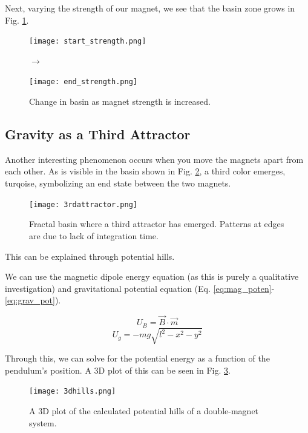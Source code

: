 \documentclass[prl,twocolumn,amsmath,amssymb,superscriptaddress]{revtex4-2}
\begin{document}
Next, varying the strength of our magnet, we see that the basin zone grows in Fig. \ref{fig:strength_interaction}.
\begin{figure}[htb]
    \begin{minipage}{0.45\linewidth}
        \texttt{[image: start\_strength.png]}
    \end{minipage}%
    \hspace{5pt}
    $\rightarrow$
    \begin{minipage}{0.45\linewidth}
        \texttt{[image: end\_strength.png]}
    \end{minipage}
    \caption{Change in basin as magnet strength is increased.}
    \label{fig:strength_interaction}
\end{figure}
\newpage
\subsection{Gravity as a Third Attractor}

Another interesting phenomenon occurs when you move the magnets apart from each other. As is visible in the basin shown in Fig. \ref{fig:3rd_attractor}, a third color emerges, turqoise, symbolizing an end state between the two magnets.

\begin{figure}[htb]
    \centering
    \vspace{-10pt}
    \texttt{[image: 3rdattractor.png]}
    \caption{Fractal basin where a third attractor has emerged. Patterns at edges are due to lack of integration time.}
    \label{fig:3rd_attractor}
\end{figure}

This can be explained through potential hills.

We can use the magnetic dipole energy equation (as this is purely a qualitative investigation) and gravitational potential equation (Eq. \ref{eq:mag_poten}-\ref{eq:grav_pot}).

\begin{equation}
    U_B = \vec{B} \cdot \vec{m}
    \label{eq:mag_poten}
\end{equation}
\begin{equation}
    U_g = -mg \sqrt{l^2-x^2-y^2}
    \label{eq:grav_pot}
\end{equation}

Through this, we can solve for the potential energy as a function of the pendulum's position. A 3D plot of this can be seen in Fig. \ref{fig:3dhills}.
\vspace{-10pt}
\begin{figure}[htb]
    \centering
    \texttt{[image: 3dhills.png]}
    \caption{A 3D plot of the calculated potential hills of a double-magnet system.}
    \label{fig:3dhills}
\end{figure}
\end{document}
